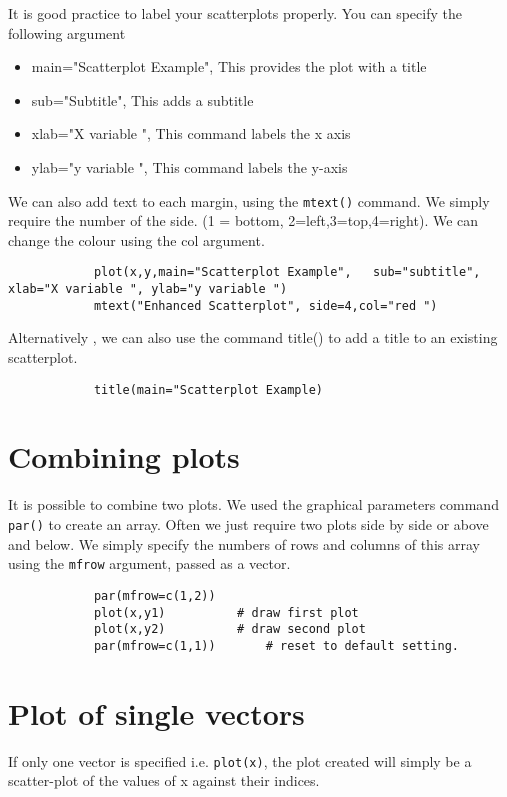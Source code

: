 			It is good practice to label your scatterplots properly. You can specify the following argument
			\begin{itemize}
				\item	main="Scatterplot Example", 	This provides the plot with a title
				\item	sub="Subtitle",                 This adds a subtitle
				\item	xlab="X variable ",				This command labels the x axis 
				\item   ylab="y variable ",				This command labels the y-axis
			\end{itemize}
			We can also add text to each margin, using the \texttt{mtext()} command.  
			We simply require the number of the side. (1 = bottom, 2=left,3=top,4=right). 
			We can change the colour using the col argument.
			\footnotesize \begin{verbatim}
			plot(x,y,main="Scatterplot Example",   sub="subtitle",    xlab="X variable ", ylab="y variable ")	
			mtext("Enhanced Scatterplot", side=4,col="red ")
			\end{verbatim}\normalsize
			Alternatively , we can also use the command title() to add a title to an existing scatterplot.
			\footnotesize \begin{verbatim}
			title(main="Scatterplot Example)	
			\end{verbatim}\normalsize
			
			
			\section{Combining plots}
			It is possible to combine two plots. We used the graphical parameters command \texttt{par()} to create an array. 
			Often we just require two plots side by side or above and below. We simply specify the numbers of rows and columns of this array using the \texttt{mfrow} argument, passed as a vector.
			
			\begin{verbatim}
			par(mfrow=c(1,2))
			plot(x,y1)			# draw first plot
			plot(x,y2)			# draw second plot
			par(mfrow=c(1,1))		# reset to default setting.
			\end{verbatim}
			
			\section{Plot of single vectors}
			If only one vector is specified i.e. \texttt{plot(x)},  the plot created will simply be a scatter-plot of the values of x against their indices.
			
